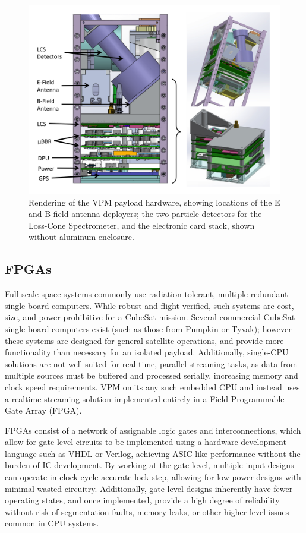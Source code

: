 \begin{figure}[htbp]
\begin{center}
\includegraphics[width=32pc]{figures/vpm_figures/payload_figure.png}
\caption[VPM payload hardware instrument arrangement]{Rendering of the VPM payload hardware, showing locations of the E and B-field antenna deployers; the two particle detectors for the Loss-Cone Spectrometer, and the electronic card stack, shown without aluminum enclosure.}
\label{fig:hardware_stack}
\end{center}
\end{figure}


\subsection{FPGAs}
Full-scale space systems commonly use radiation-tolerant, multiple-redundant single-board computers. While robust and flight-verified, such systems are cost, size, and power-prohibitive for a CubeSat mission. Several commercial CubeSat single-board computers exist (such as those from Pumpkin or Tyvak); however these systems are designed for general satellite operations, and provide more functionality than necessary for an isolated payload. Additionally, single-CPU solutions are not well-suited for real-time, parallel streaming tasks, as data from multiple sources must be buffered and processed serially, increasing memory and clock speed requirements. VPM omits any such embedded CPU and instead uses a realtime streaming solution implemented entirely in a Field-Programmable Gate Array (FPGA). 

FPGAs consist of a network of assignable logic gates and interconnections, which allow for gate-level circuits to be implemented using a hardware development language such as VHDL or Verilog, achieving ASIC-like performance without the burden of IC development. By working at the gate level, multiple-input designs can operate in clock-cycle-accurate lock step, allowing for low-power designs with minimal wasted circuitry. Additionally, gate-level designs inherently have fewer operating states, and once implemented, provide a high degree of reliability without risk of segmentation faults, memory leaks, or other higher-level issues common in CPU systems.

